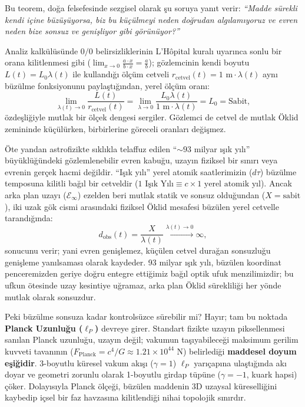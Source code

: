 \begin{remark}
    \label{rem:lhopital_ve_planck_monograph}
    Bu teorem, doğa felsefesinde sezgisel olarak şu soruya yanıt verir: \textit{``Madde sürekli kendi içine büzüşüyorsa, biz bu küçülmeyi neden doğrudan algılamıyoruz ve evren neden bize sonsuz ve genişliyor gibi görünüyor?''}

    Analiz kalkülüsünde $0/0$ belirsizliklerinin L'H\^opital kuralı uyarınca sonlu bir orana kilitlenmesi gibi ($\lim_{x \to 0} \frac{a \cdot x}{b \cdot x} = \frac{a}{b}$); gözlemcinin kendi boyutu $L(t) = L_0 \lambda(t)$ ile kullandığı ölçüm cetveli $r_{\mathrm{cetvel}}(t) = 1\text{ m} \cdot \lambda(t)$ aynı büzülme fonksiyonunu paylaştığından, yerel ölçüm oranı:
    \begin{equation}
        \lim_{\lambda(t) \to 0} \frac{L(t)}{r_{\mathrm{cetvel}}(t)} = \lim_{\lambda \to 0} \frac{L_0 \lambda(t)}{1\text{ m} \cdot \lambda(t)} = L_0 = \text{Sabit},
        \label{eq:lhopital_oran_monograph}
    \end{equation}
    özdeşliğiyle mutlak bir ölçek dengesi sergiler. Gözlemci de cetvel de mutlak Öklid zemininde küçülürken, birbirlerine göreceli oranları değişmez.

    Öte yandan astrofizikte sıklıkla telaffuz edilen ``$\sim 93$ milyar ışık yılı'' büyüklüğündeki gözlemlenebilir evren kabuğu, uzayın fiziksel bir sınırı veya evrenin gerçek hacmi değildir. ``Işık yılı'' yerel atomik saatlerimizin ($d\tau$) büzülme temposuna kilitli bağıl bir cetveldir ($1\text{ Işık Yılı} \equiv c \times 1\text{ yerel atomik yıl}$). Ancak arka plan uzayı ($\mathcal{E}_\infty$) ezelden beri mutlak statik ve sonsuz olduğundan ($X = \text{sabit}$), iki uzak gök cismi arasındaki fiziksel Öklid mesafesi büzülen yerel cetvelle tarandığında:
    \begin{equation}
        d_{\mathrm{obs}}(t) = \frac{X}{\lambda(t)} \xrightarrow{\lambda(t) \to 0} \infty,
        \label{eq:sonsuz_arka_plan_iraksama_monograph}
    \end{equation}
    sonucunu verir; yani evren genişlemez, küçülen cetvel durağan sonsuzluğu genişleme yanılsaması olarak kaydeder. 93 milyar ışık yılı, büzülen koordinat penceremizden geriye doğru entegre ettiğimiz bağıl optik ufuk menzilimizdir; bu ufkun ötesinde uzay kesintiye uğramaz, arka plan Öklid sürekliliği her yönde mutlak olarak sonsuzdur.

    Peki büzülme sonsuza kadar kontrolsüzce sürebilir mi? Hayır; tam bu noktada \textbf{Planck Uzunluğu ($\ell_P$)} devreye girer. Standart fizikte uzayın piksellenmesi sanılan Planck uzunluğu, uzayın değil; vakumun taşıyabileceği maksimum gerilim kuvveti tavanının ($F_{\mathrm{Planck}} = c^4/G \approx 1.21 \times 10^{44}\text{ N}$) belirlediği \textbf{maddesel doyum eşiğidir}. 3-boyutlu küresel vakum akışı ($\gamma = 1$) $\ell_P$ yarıçapına ulaştığında akı doyar ve geometri zorunlu olarak 1-boyutlu girdap tüpüne ($\gamma = -1$, kuark hapsi) çöker. Dolayısıyla Planck ölçeği, büzülen maddenin 3D uzaysal küreselliğini kaybedip içsel bir faz havzasına kilitlendiği nihai topolojik sınırdır.
\end{remark}

